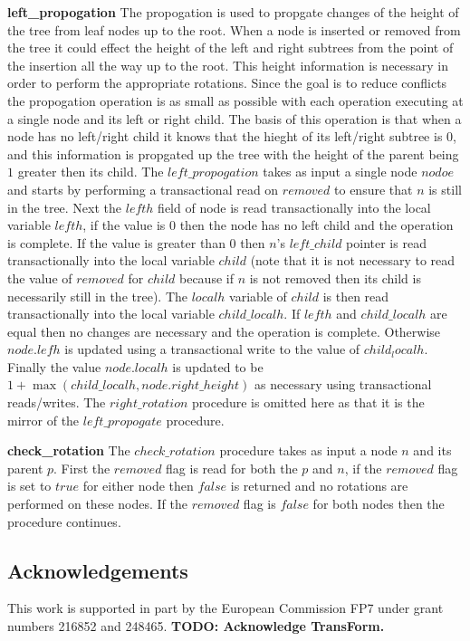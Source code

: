 \documentclass[10pt]{sigplanconf}
\begin{document}
{\bf left\_propogation} The propogation is used to propgate changes of the height of the tree from leaf nodes up to the root.
When a node is inserted or removed from the tree it could effect the height of the left and right subtrees from the point of the insertion all the way up to the root.
This height information is necessary in order to perform the appropriate rotations.
Since the goal is to reduce conflicts the propogation operation is as small as possible with each operation executing at a single node and its left or right child.
The basis of this operation is that when a node has no left/right child it knows that the hieght of its left/right subtree is $0$, and this information is propgated up the tree with the height of the parent being $1$ greater then its child.
The $left\_propogation$ takes as input a single node $nodoe$ and starts by performing a transactional read on $removed$ to ensure that $n$ is still in the tree.
Next the $lefth$ field of node is read transactionally into the local variable $lefth$, if the value is $0$ then the node has no left child and the operation is complete.
If the value is greater than $0$ then $n$'s $left\_child$ pointer is read transactionally into the local variable $child$ (note that it is not necessary to read the value of $removed$ for $child$ because if $n$ is not removed then its child is necessarily still in the tree).
The $localh$ variable of $child$ is then read transactionally into the local variable $child\_localh$.
If $lefth$ and $child\_localh$ are equal then no changes are necessary and the operation is complete.
Otherwise $node.lefh$ is updated using a transactional write to the value of $child_localh$.
Finally the value $node.localh$ is updated to be $1 + \max(child\_localh, node.right\_height)$ as necessary using transactional reads/writes.
The $right\_rotation$ procedure is omitted here as that it is the mirror of the $left\_propogate$ procedure.

{\bf check\_rotation} The $check\_rotation$ procedure takes as input a node $n$ and its parent $p$.
First the $removed$ flag is read for both the $p$ and $n$, if the $removed$ flag is set to $true$ for either node then $false$ is returned and no rotations are performed on these nodes.
If the $removed$ flag is $false$ for both nodes then the procedure continues.


\subsection*{Acknowledgements}
This work is supported in part by the European Commission FP7 under grant numbers 216852 and 248465.
{\bf TODO: Acknowledge TransForm.}




\end{document}
